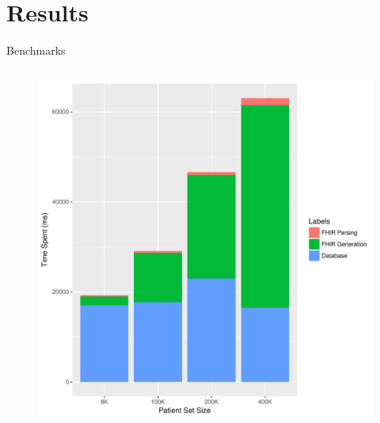 \documentclass[10pt]{beamer}
\begin{document}
%
\section{Results}
\begin{frame}{Benchmarks}{}
 \begin{columns}[T,onlytextwidth]
        \begin{column}{.6\textwidth}
            \begin{onlyenv}
                \begin{minipage}{\textwidth}
                    \begin{figure}
\includegraphics[height=.7\textheight]{images/graph1.pdf}
                    \end{figure}
                \end{minipage}
            \end{onlyenv}

\end{column}
\end{columns}
\end{frame}
\end{document}
